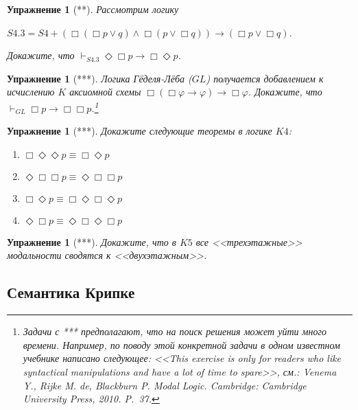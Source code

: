 \documentclass[11pt]{article}
\newtheorem{exercise}[theorem]{Упражнение}
\begin{document}
\begin{exercise}[**]
Рассмотрим логику 
\begin{center}
$S4.3 = S4 + (\Box (\Box p \vee q) \wedge \Box (p\vee \Box q)) \to (\Box p \vee \Box q) $.	
\end{center}

 Докажите, что 
$\vdash_{S4.3} \Diamond \Box p \to \Box \Diamond p$.
\end{exercise}


\begin{exercise}[***] Логика Гёделя-Лёба ($GL$) получается добавлением к исчислению $K$ аксиомной схемы $\Box (\Box \varphi \to \varphi) \to \Box \varphi$. Докажите, что  $\vdash_{GL} \Box p \to \Box \Box p$.\footnote{ Задачи с *** предполагают, что на поиск решения может уйти много времени. Например, по поводу этой конкретной задачи в одном известном учебнике написано следующее: <<This exercise is only for readers who like syntactical manipulations and have a lot of time to spare>>, см.: \textit{Venema Y., Rijke M. de,  Blackburn P.} Modal Logic. Cambridge: Cambridge University Press, 2010. P.~37.}
\end{exercise}

\begin{exercise}[***] Докажите следующие теоремы в логике $K4$:
\begin{multicols}{2}
\begin{enumerate}
\item $\Box \Diamond \Diamond p \equiv \Box \Diamond p$
\item $\Diamond \Box \Box p \equiv \Diamond \Box \Box p$
\item $\Box \Diamond p \equiv \Box \Diamond \Box \Diamond p$
\item $\Diamond \Box p \equiv \Diamond \Box \Diamond \Box p$
\end{enumerate}
\end{multicols}
\end{exercise}

	
\begin{exercise}[***]
	Докажите, что в  $K5$ все <<трехэтажные>> модальности сводятся к <<двухэтажным>>. 	
\end{exercise}

\subsection{Семантика Крипке}
\end{document}
